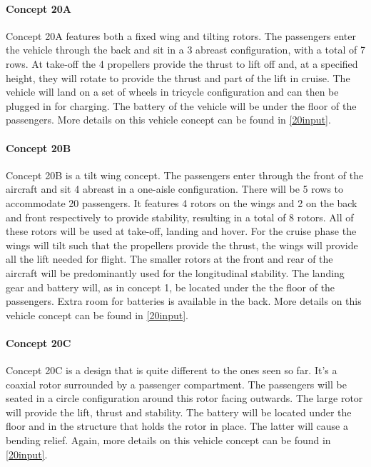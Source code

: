 \paragraph{Concept 20A}
Concept 20A features both a fixed wing and tilting rotors. The passengers enter the vehicle through the back and sit in a 3 abreast configuration, with a total of 7 rows. At take-off the 4 propellers provide the thrust to lift off and, at a specified height, they will rotate to provide the thrust and part of the lift in cruise. The vehicle will land on a set of wheels in tricycle configuration and can then be plugged in for charging. The battery of the vehicle will be under the floor of the passengers. More details on this vehicle concept can be found in \autoref{20input}.  

\paragraph{Concept 20B}
Concept 20B is a tilt wing concept. The passengers enter through the front of the aircraft and sit 4 abreast in a one-aisle configuration. There will be 5 rows to accommodate 20 passengers. It features 4 rotors on the wings and 2 on the back and front respectively to provide stability, resulting in a total of 8 rotors. All of these rotors will be used at take-off, landing and hover. For the cruise phase the wings will tilt such that the propellers provide the thrust, the wings will provide all the lift needed for flight. The smaller rotors at the front and rear of the aircraft will be predominantly used for the longitudinal stability. The landing gear and battery will, as in concept 1, be located under the the floor of the passengers. Extra room for batteries is available in the back. More details on this vehicle concept can be found in \autoref{20input}.  

\paragraph{Concept 20C}
Concept 20C is a design that is quite different to the ones seen so far. It's a coaxial rotor surrounded by a passenger compartment. The passengers will be seated in a circle configuration around this rotor facing outwards. The large rotor will provide the lift, thrust and stability. The battery will be located under the floor and in the structure that holds the rotor in place. The latter will cause a bending relief.  Again, more details on this vehicle concept can be found in \autoref{20input}.  

